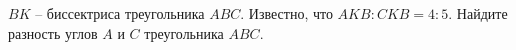 \begin{ex}
	\begin{condition}
		\( BK \) – биссектриса треугольника \( ABC \). Известно, что \( AKB : CKB = 4 : 5  \). Найдите разность углов \( A  \) и \( C \) треугольника \( ABC \).
	\end{condition}
	\answer{\( 10\degree \)}
\end{ex}